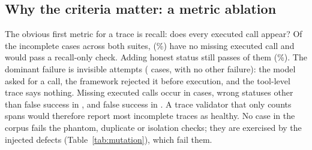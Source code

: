 \documentclass[10pt]{article}
\begin{document}
\subsection{Why the criteria matter: a metric ablation}
The obvious first metric for a trace is recall: does every executed call appear? Of the \ablIncomplete{} incomplete cases across both suites, \ablRecallMiss{} (\ablRecallMissPct\%) have no missing executed call and would pass a recall-only check. Adding honest status still passes \ablRSMiss{} of them (\ablRSMissPct\%). The dominant failure is invisible attempts (\ablInvisible{} cases, \ablInvisibleOnly{} with no other failure): the model asked for a call, the framework rejected it before execution, and the tool-level trace says nothing. Missing executed calls occur in \ablMissing{} cases, wrong statuses other than false success in \ablStatus{}, and false success in \ablFalseOk{}. A trace validator that only counts spans would therefore report most incomplete traces as healthy. No case in the corpus fails the phantom, duplicate or isolation checks; they are exercised by the injected defects (Table~\ref{tab:mutation}), which fail them.
\end{document}
